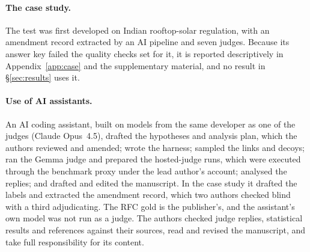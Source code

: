 \paragraph{The case study.}
The test was first developed on Indian rooftop-solar regulation, with an amendment record extracted by an AI pipeline
and seven judges. Because its answer key failed the quality checks set for it, it is reported descriptively in
Appendix~\ref{app:case} and the supplementary material, and no result in \S\ref{sec:results} uses it.

\paragraph{Use of AI assistants.}\label{sec:ai-use}
An AI coding assistant, built on models from the same developer as one of the judges (Claude Opus~4.5), drafted the
hypotheses and analysis plan, which the authors reviewed and amended; wrote the harness; sampled the links and
decoys; ran the Gemma judge and prepared the hosted-judge runs, which were executed through the benchmark proxy under
the lead author's account; analysed the replies; and drafted and edited the manuscript. In the case study it drafted
the labels and extracted the amendment record, which two authors checked blind with a third adjudicating. The RFC
gold is the publisher's, and the assistant's own model was not run as a judge. The authors checked judge replies,
statistical results and references against their sources, read and revised the manuscript, and take full
responsibility for its content.
